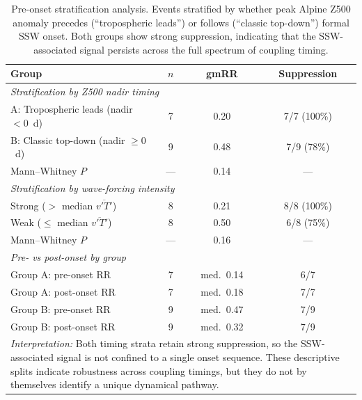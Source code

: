 \documentclass[11pt,letterpaper]{article}
\begin{document}
\begin{table}[htbp]
\centering
\caption{Pre-onset stratification analysis. Events stratified by whether peak Alpine Z500 anomaly precedes (``tropospheric leads'') or follows (``classic top-down'') formal SSW onset. Both groups show strong suppression, indicating that the SSW-associated signal persists across the full spectrum of coupling timing.}
\label{tab:pre_onset_stratification}
\begin{tabular}{lccc}
\toprule
\textbf{Group} & \textbf{$n$} & \textbf{gmRR} & \textbf{Suppression} \\
\midrule
\multicolumn{4}{l}{\emph{Stratification by Z500 nadir timing}} \\
\midrule
A: Tropospheric leads (nadir $< 0$~d) & 7 & 0.20 & 7/7 (100\%) \\
B: Classic top-down (nadir $\geq 0$~d) & 9 & 0.48 & 7/9 (78\%) \\
Mann--Whitney $P$ & --- & 0.14 & --- \\
\midrule
\multicolumn{4}{l}{\emph{Stratification by wave-forcing intensity}} \\
\midrule
Strong ($> $ median $\overline{v'T'}$) & 8 & 0.21 & 8/8 (100\%) \\
Weak ($\leq$ median $\overline{v'T'}$) & 8 & 0.50 & 6/8 (75\%) \\
Mann--Whitney $P$ & --- & 0.16 & --- \\
\midrule
\multicolumn{4}{l}{\emph{Pre- vs post-onset by group}} \\
\midrule
Group A: pre-onset RR & 7 & med.~0.14 & 6/7 \\
Group A: post-onset RR & 7 & med.~0.18 & 7/7 \\
Group B: pre-onset RR & 9 & med.~0.47 & 7/9 \\
Group B: post-onset RR & 9 & med.~0.32 & 7/9 \\
\midrule
\multicolumn{4}{p{13cm}}{\emph{Interpretation:} Both timing strata retain strong suppression, so the SSW-associated signal is not confined to a single onset sequence. These descriptive splits indicate robustness across coupling timings, but they do not by themselves identify a unique dynamical pathway.} \\
\bottomrule
\end{tabular}
\end{table}
\end{document}
